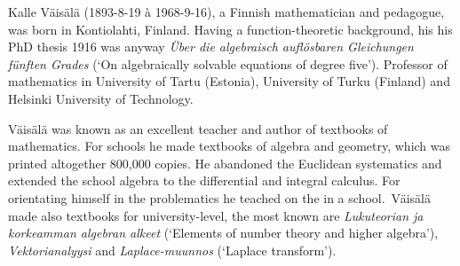 \documentclass[12pt]{article}
\theoremstyle{definition}
\begin{document}
Kalle V\"ais\"al\"a (1893-8-19 \`a 1968-9-16), a Finnish mathematician and pedagogue, was born in Kontiolahti, Finland.  Having a function-theoretic background, his his PhD thesis 1916 was anyway {\em \"Uber die algebraisch aufl\"osbaren Gleichungen f\"unften Grades} (`On algebraically solvable equations of degree five').  Professor of mathematics in University of Tartu (Estonia), University of Turku (Finland) and Helsinki University of Technology.

V\"ais\"al\"a was known as an excellent teacher and author of textbooks of mathematics.  For schools he made textbooks of algebra and geometry, which was printed altogether 800,000 copies.  He abandoned the Euclidean systematics and extended the school algebra to the differential and integral calculus.  For orientating himself in the problematics he teached on the  in a school.\, V\"ais\"al\"a made also textbooks for university-level, the most known are {\em Lukuteorian ja korkeamman algebran alkeet} (`Elements of number theory and higher algebra'), {\em Vektorianalyysi} and {\em Laplace-muunnos} (`Laplace transform').
\end{document}
